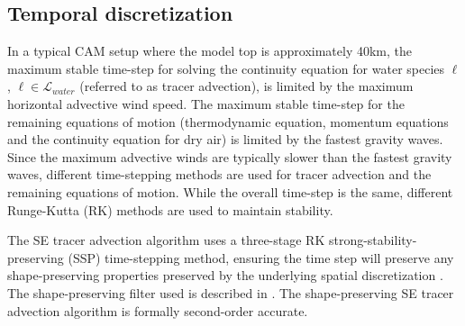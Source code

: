 \documentclass{agujournal}
\begin{document}
{%

\subsection{Temporal discretization}
In a typical CAM setup where the model top is approximately 40km, the maximum stable time-step for solving the continuity equation for water species $\ell$, $\ell \in \mathcal{L}_{water}$ (referred to as tracer advection), is limited by the maximum horizontal advective wind speed. The maximum stable time-step for the remaining equations of motion (thermodynamic equation, momentum equations and the continuity equation for dry air) is limited by the fastest gravity waves.  Since the maximum advective winds are typically slower than the fastest gravity waves, different time-stepping methods are used for tracer advection and the remaining equations of motion. While the overall time-step is the same, different Runge-Kutta (RK) methods are used to maintain stability. 

The SE tracer advection algorithm uses a three-stage RK strong-stability-preserving (SSP) time-stepping method, ensuring the time step will preserve any shape-preserving properties preserved by the underlying spatial discretization \citep{SR2002SIAM}. The shape-preserving filter used is described in \citet{GTS2014JCP}. The shape-preserving SE tracer advection algorithm is formally second-order accurate.

}
\end{document}
